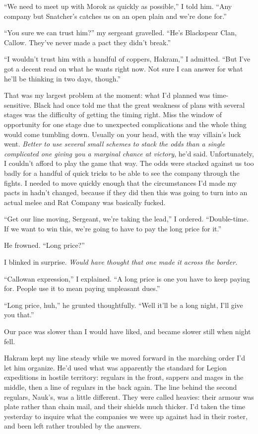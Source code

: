 \documentclass[12pt, openany]{book}
\begin{document}
“We need to meet up with Morok as quickly as possible,” I told him. “Any company but Snatcher’s catches us on an open plain and we’re done for.”

“You sure we can trust him?” my sergeant gravelled. “He’s Blackspear Clan, Callow. They’ve never made a pact they didn’t break.”

“I wouldn’t trust him with a handful of coppers, Hakram,” I admitted. “But I’ve got a decent read on what he wants right now. Not sure I can answer for what he’ll be thinking in two days, though.”

That was my largest problem at the moment: what I’d planned was time-sensitive. Black had once told me that the great weakness of plans with several stages was the difficulty of getting the timing right. Miss the window of opportunity for one stage due to unexpected complications and the whole thing would come tumbling down. Usually on your head, with the way villain’s luck went. \textit{Better to use several small schemes to stack the odds than a single complicated one giving you a marginal chance at victory}, he’d said. Unfortunately, I couldn’t afford to play the game that way. The odds were stacked against us too badly for a handful of quick tricks to be able to see the company through the fights. I needed to move quickly enough that the circumstances I’d made my pacts in hadn’t changed, because if they did then this was going to turn into an actual melee and Rat Company was basically fucked.

“Get our line moving, Sergeant, we’re taking the lead,” I ordered. “Double-time. If we want to win this, we’re going to have to pay the long price for it.”

He frowned. “Long price?”

I blinked in surprise. \textit{Would have thought that one made it across the border. }

“Callowan expression,” I explained. “A long price is one you have to keep paying for. People use it to mean paying unpleasant dues.”

“Long price, huh,” he grunted thoughtfully. “Well it’ll be a long night, I’ll give you that.”

Our pace was slower than I would have liked, and became slower still when night fell.

Hakram kept my line steady while we moved forward in the marching order I’d let him organize. He’d used what was apparently the standard for Legion expeditions in hostile territory: regulars in the front, sappers and mages in the middle, then a line of regulars in the back again. The line behind the second regulars, Nauk’s, was a little different. They were called heavies: their armour was plate rather than chain mail, and their shields much thicker. I’d taken the time yesterday to inquire what the companies we were up against had in their roster, and been left rather troubled by the answers. 
\end{document}
